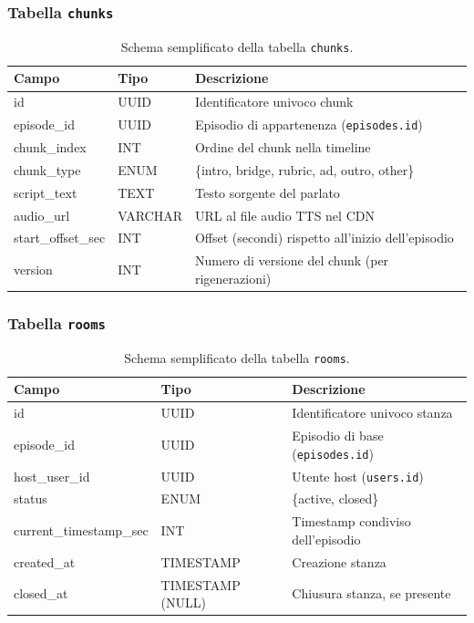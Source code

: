\documentclass[11pt,a4paper]{article}
\begin{document}
\subsubsection*{Tabella \texttt{chunks}}

\begin{table}[H]
    \centering
    \begin{tabular}{llp{7cm}}
        \toprule
        \textbf{Campo} & \textbf{Tipo} & \textbf{Descrizione} \\
        \midrule
        id & UUID & Identificatore univoco chunk \\
        episode\_id & UUID & Episodio di appartenenza (\texttt{episodes.id}) \\
        chunk\_index & INT & Ordine del chunk nella timeline \\
        chunk\_type & ENUM & \{intro, bridge, rubric, ad, outro, other\} \\
        script\_text & TEXT & Testo sorgente del parlato \\
        audio\_url & VARCHAR & URL al file audio TTS nel CDN \\
        start\_offset\_sec & INT & Offset (secondi) rispetto all’inizio dell’episodio \\
        version & INT & Numero di versione del chunk (per rigenerazioni) \\
        \bottomrule
    \end{tabular}
    \caption{Schema semplificato della tabella \texttt{chunks}.}
\end{table}

\subsubsection*{Tabella \texttt{rooms}}

\begin{table}[H]
    \centering
    \begin{tabular}{llp{7cm}}
        \toprule
        \textbf{Campo} & \textbf{Tipo} & \textbf{Descrizione} \\
        \midrule
        id & UUID & Identificatore univoco stanza \\
        episode\_id & UUID & Episodio di base (\texttt{episodes.id}) \\
        host\_user\_id & UUID & Utente host (\texttt{users.id}) \\
        status & ENUM & \{active, closed\} \\
        current\_timestamp\_sec & INT & Timestamp condiviso dell’episodio \\
        created\_at & TIMESTAMP & Creazione stanza \\
        closed\_at & TIMESTAMP (NULL) & Chiusura stanza, se presente \\
        \bottomrule
    \end{tabular}
    \caption{Schema semplificato della tabella \texttt{rooms}.}
\end{table}
\end{document}
